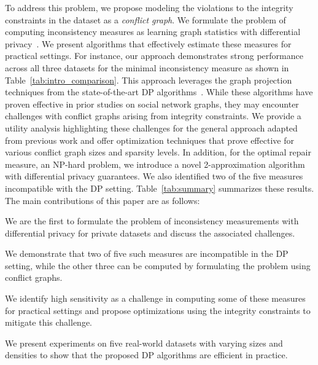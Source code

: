 To address this problem, we propose modeling the violations to the integrity constraints in the dataset as a \emph{conflict graph}. We formulate the problem of computing inconsistency measures as learning graph statistics with differential privacy~\cite{hay2009accurate,KasiviswanathanNRS13,day2016publishing}. We present algorithms that effectively estimate these measures for practical settings. For instance, our approach demonstrates strong performance across all three datasets for the minimal inconsistency measure as shown in Table~\ref{tab:intro_comparison}. This approach leverages the graph projection techniques from the state-of-the-art DP algorithms~\cite{day2016publishing}. While these algorithms have proven effective in prior studies on social network graphs, they may encounter challenges with conflict graphs arising from integrity constraints. 
We provide a utility analysis highlighting these challenges for the general approach adapted from previous work and offer optimization techniques that prove effective for various conflict graph sizes and sparsity levels. In addition, for the optimal repair measure, an NP-hard problem,  we introduce a novel 2-approximation algorithm with differential privacy guarantees. We also identified two of the five measures incompatible with the DP setting. Table~\ref{tab:summary} summarizes these results.
The main contributions of this paper are as follows: 
\squishlist
    \item We are the first to formulate the problem of inconsistency measurements with differential privacy for private datasets and discuss the associated challenges.
    \item We demonstrate that two of five such measures are incompatible in the DP setting, while the other three can be computed by formulating the problem using conflict graphs.
    \item We identify high sensitivity as a challenge in computing some of these measures for practical settings and propose optimizations using the integrity constraints to mitigate this challenge.
    \item We present experiments on five real-world datasets with varying sizes and densities to show that the proposed DP algorithms are efficient in practice.
\squishend

